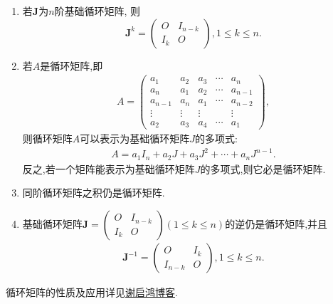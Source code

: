 \documentclass[../../main.tex]{subfiles}%
\begin{document}
\begin{proposition}[循环矩阵的性质]\label{proposition:循环矩阵的性质}
\begin{enumerate}
\item 若$\boldsymbol{J}$为$n$阶基础循环矩阵,
则
\[
\boldsymbol{J}^{k} = 
\begin{pmatrix}
O & I_{n - k} \\
I_{k} & O
\end{pmatrix},  1 \leqslant  k \leqslant  n.
\]
\item 若$A$是循环矩阵,即\begin{align*}
A=\begin{pmatrix}
a_1 & a_2 & a_3 & \cdots & a_n \\
a_n & a_1 & a_2 & \cdots & a_{n - 1} \\
a_{n - 1} & a_n & a_1 & \cdots & a_{n - 2} \\
\vdots & \vdots & \vdots & & \vdots \\
a_2 & a_3 & a_4 & \cdots & a_1
\end{pmatrix},
\end{align*}
则循环矩阵$A$可以表示为基础循环矩阵$J$的多项式:
\begin{align*}
A=a_1I_n+a_2J+a_3J^2+\cdots+a_nJ^{n-1}.
\end{align*}
反之,若一个矩阵能表示为基础循环矩阵$J$的多项式,则它必是循环矩阵.
\item \label{example:iten546641856}同阶循环矩阵之积仍是循环矩阵.
\item 基础循环矩阵$\boldsymbol{J}=
\begin{pmatrix}
O & I_{n - k} \\
I_{k} & O
\end{pmatrix} (1 \leqslant  k \leqslant  n)$的逆仍是循环矩阵,并且
\begin{align*}
\boldsymbol{J}^{-1} =\begin{pmatrix}
O & I_{k} \\
I_{n-k} & O
\end{pmatrix},1 \leqslant  k \leqslant  n.
\end{align*}
\end{enumerate}
\end{proposition}
\begin{note}
循环矩阵的性质及应用详见\href{https://www.cnblogs.com/torsor/p/8848641.html}{谢启鸿博客}.
\end{note}
\end{document}
